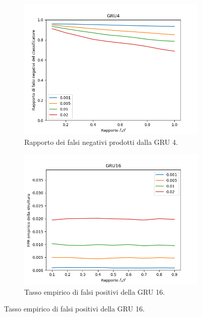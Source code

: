 \documentclass[../../main.tex]{subfiles}
\begin{document}
\begin{figure}[H]
\begin{subfigure}[b]{0.32\textwidth}
        \end{subfigure}
        \begin{subfigure}[b]{0.32\textwidth}
            \centering
            \includegraphics[width = \textwidth]{immagini/7/LBF/GRU4_FNR.png}
            \caption{Rapporto dei falsi negativi prodotti dalla GRU 4.}
            \label{fig:LBFFNR_GRU4}
        \end{subfigure}
        \begin{subfigure}[b]{0.32\textwidth}
            \centering
            \includegraphics[width = \textwidth]{immagini/7/LBF/GRU16_FPR.png}
            \caption{Tasso empirico di falsi positivi della GRU 16.}
            \label{fig:LBFFPR_GRU16}
        \end{subfigure}

\end{figure}
\end{document}
